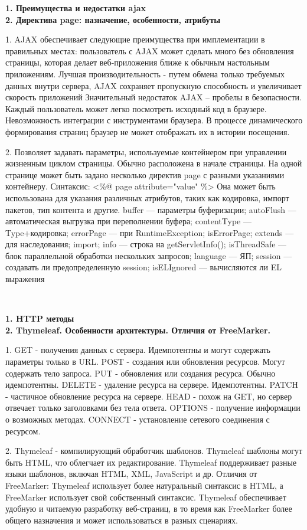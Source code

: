\documentclass{article}
\begin{document}
\begin{minipage}{.3\textwidth}
    \textbf{1. Преимущества и недостатки ajax}\\
    \textbf{2. Директива page: назначение, особенности, атрибуты}

1. AJAX обеспечивает следующие преимущества при имплементации в правильных местах: пользователь с AJAX может сделать много без обновления страницы, которая делает веб-приложения ближе к обычным настольным приложениям.
Лучшая производительность - путем обмена только требуемых данных внутри сервера, AJAX сохраняет пропускную способность и увеличивает скорость приложений
Значительный недостаток AJAX – пробелы в безопасности. Каждый пользователь может легко посмотреть исходный код в браузере. Невозможность интеграции с инструментами браузера. В процессе динамического формирования страниц браузер не может отображать их в истории посещения.


2. Позволяет задавать параметры, используемые контейнером при управлении жизненным циклом страницы. Обычно расположена в начале страницы.
На одной странице может быть задано несколько директив page с разными указаниями контейнеру.
Синтаксис:
<\%@ page attribute="value" \%>
Она может быть использована для указания различных атрибутов, таких как кодировка, импорт пакетов, тип контента и другие.
buffer — параметры буферизации; autoFlush — автоматическая выгрузка при переполнении буфера; contentType — Type+кодировка; errorPage — при RuntimeException; isErrorPage; extends — для наследования; import; 
info — строка на getServletInfo(); isThreadSafe — блок параллельной обработки нескольких запросов; language — ЯП; session — создавать ли предопределенную session; isELIgnored — вычисляются ли EL выражения
\end{minipage}
\\
\begin{minipage}{.3\textwidth}
    \textbf{1. HTTP методы}\\
    \textbf{2. Thymeleaf. Особенности архитектуры. Отличия от FreeMarker.}

1. GET - получения данных с сервера. Идемпотентны и могут содержать параметры только в URL.
POST - создания или обновления ресурсов. Могут содержать тело запроса.
PUT - обновления или создания ресурса. Обычно идемпотентны.
DELETE -  удаление ресурса на сервере. Идемпотентны.
PATCH - частичное обновление ресурса на сервере.
HEAD - похож на GET, но сервер отвечает только заголовками без тела ответа.
OPTIONS - получение информации о возможных методах.
CONNECT - установление сетевого соединения с ресурсом.

2. Thymeleaf - компилирующий обработчик шаблонов. Thymeleaf шаблоны могут быть HTML, что облегчает их редактирование.
Thymeleaf поддерживает разные языки шаблонов, включая HTML, XML, JavaScript и др. Отличия от FreeMarker:
Thymeleaf использует более натуральный синтаксис в HTML, а FreeMarker использует свой собственный синтаксис.
Thymeleaf обеспечивает удобную и читаемую разработку веб-страниц, в то время как FreeMarker более общего назначения и может использоваться в разных сценариях.
\end{minipage}
\end{document}
